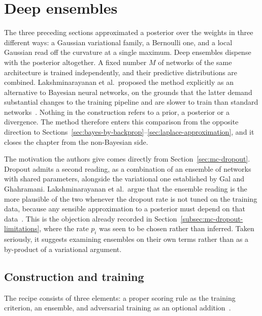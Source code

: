 \section{Deep ensembles}
\label{sec:deep-ensembles}

The three preceding sections approximated a posterior over the weights in three
different ways: a Gaussian variational family, a Bernoulli one, and a local
Gaussian read off the curvature at a single maximum. Deep ensembles dispense
with the posterior altogether. A fixed number $M$ of networks of the same
architecture is trained independently, and their predictive distributions are
combined. Lakshminarayanan et al.\ proposed the method explicitly as an
alternative to Bayesian neural networks, on the grounds that the latter demand
substantial changes to the training pipeline and are slower to train than
standard networks~\cite{lakshminarayanan2017}. Nothing in the construction
refers to a prior, a posterior or a divergence. The method therefore enters this
comparison from the opposite direction to
Sections~\ref{sec:bayes-by-backprop}--\ref{sec:laplace-approximation}, and it
closes the chapter from the non-Bayesian side.

The motivation the authors give comes directly from
Section~\ref{sec:mc-dropout}. Dropout admits a second reading, as a combination
of an ensemble of networks with shared parameters, alongside the variational one
established by Gal and Ghahramani. Lakshminarayanan et al.\ argue that the
ensemble reading is the more plausible of the two whenever the dropout rate is
not tuned on the training data, because any sensible approximation to a
posterior must depend on that data~\cite{lakshminarayanan2017}. This is the
objection already recorded in Section~\ref{subsec:mc-dropout-limitations},
where the rate $p_i$ was seen to be chosen rather than inferred. Taken
seriously, it suggests examining ensembles on their own terms rather than as a
by-product of a variational argument.

\subsection{Construction and training}
\label{subsec:ensembles-training}

The recipe consists of three elements: a proper scoring rule as the training
criterion, an ensemble, and adversarial training as an optional
addition~\cite{lakshminarayanan2017}.


